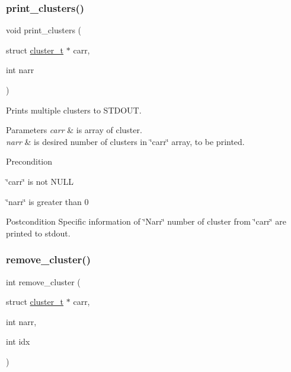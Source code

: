 \subsubsection{\texorpdfstring{print\+\_\+clusters()}{print\_clusters()}}
{\footnotesize\ttfamily void print\+\_\+clusters (\begin{DoxyParamCaption}\item[{struct \mbox{\hyperlink{structcluster__t}{cluster\+\_\+t}} $\ast$}]{carr,  }\item[{int}]{narr }\end{DoxyParamCaption})}



Prints multiple clusters to S\+T\+D\+O\+UT. 


\begin{DoxyParams}{Parameters}
{\em carr} & is array of cluster.\\
\hline
{\em narr} & is desired number of clusters in \char`\"{}carr\char`\"{} array, to be printed.\\
\hline
\end{DoxyParams}
\begin{DoxyPrecond}{Precondition}

\begin{DoxyItemize}
\item \char`\"{}carr\char`\"{} is not N\+U\+LL
\item \char`\"{}narr\char`\"{} is greater than 0
\end{DoxyItemize}
\end{DoxyPrecond}
\begin{DoxyPostcond}{Postcondition}
Specific information of \char`\"{}\+Narr\char`\"{} number of cluster from \char`\"{}carr\char`\"{} are printed to stdout. 
\end{DoxyPostcond}
\mbox{\label{group___cluster_operations_gaf73744f9128e4605127b40932a730a48}} 
\subsubsection{\texorpdfstring{remove\+\_\+cluster()}{remove\_cluster()}}
{\footnotesize\ttfamily int remove\+\_\+cluster (\begin{DoxyParamCaption}\item[{struct \mbox{\hyperlink{structcluster__t}{cluster\+\_\+t}} $\ast$}]{carr,  }\item[{int}]{narr,  }\item[{int}]{idx }\end{DoxyParamCaption})}



